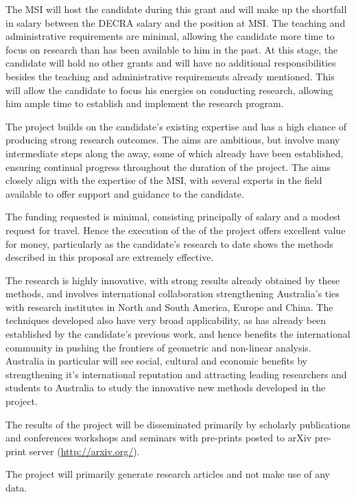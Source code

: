 \documentclass[12pt]{amsart}
\begin{document}
The MSI will host the candidate during this grant and will make up the shortfall in salary between the DECRA salary and the position at MSI. The teaching and administrative requirements are minimal, allowing the candidate more time to focus on research than has been available to him in the past. At this stage, the candidate will hold no other grants and will have no additional responsibilities besides the teaching and administrative requirements already mentioned. This will allow the candidate to focus his energies on conducting research, allowing him ample time to establish and implement the research program.

\smallskip{}
\label{sec-5}

The project builds on the candidate's existing expertise and has a high chance of producing strong research outcomes. The aims are ambitious, but involve many intermediate steps along the away, some of which already have been established, ensuring continual progress throughout the duration of the project. The aims closely align with the expertise of the MSI, with several experts in the field available to offer support and guidance to the candidate.

\smallskip{}
\label{sec-6}

The funding requested is minimal, consisting principally of salary and a modest request for travel. Hence the execution of the of the project offers excellent value for money, particularly as the candidate's research to date shows the methods described in this proposal are extremely effective. 

The research is highly innovative, with strong results already obtained by these methods, and involves international collaboration strengthening Australia's ties with research institutes in North and South America, Europe and China. The techniques developed also have very broad applicability, as has already been established by the candidate's previous work, and hence benefits the international community in pushing the frontiers of geometric and non-linear analysis. Australia in particular will see social, cultural and economic benefits by strengthening it's international reputation and attracting leading researchers and students to Australia to study the innovative new methods developed in the project.

\smallskip{}
\label{sec-7}

The results of the project will be disseminated primarily by scholarly publications and conferences workshops and seminars with pre-prints posted to arXiv pre-print server (\url{http://arxiv.org/}).

\smallskip{}
\label{sec-8}

The project will primarily generate research articles and not make use of any data.

\printbibliography
\end{document}
